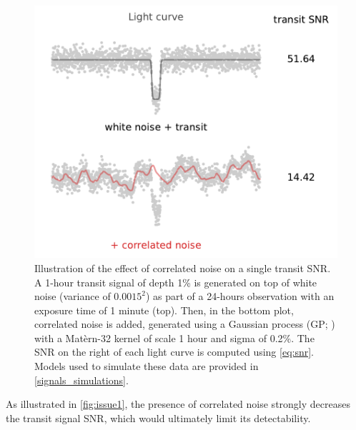 \documentclass[modern]{aastex631}
\begin{document}
\begin{figure}[H]
    \begin{centering}
        \includegraphics[width=0.6\linewidth]{../workflows/plot_issues/figures/issue1.pdf}
        \caption{Illustration of the effect of correlated noise on a single transit SNR. A 1-hour transit signal of depth 1\% is generated on top of white noise (variance of $0.0015^2$) as part of a 24-hours observation with an exposure time of 1 minute (top). Then, in the bottom plot, correlated noise is added, generated using a Gaussian process (GP; \citealt{Rasmussen2005}) with a Matèrn-32 kernel of scale 1 hour and sigma of 0.2\%. The SNR on the right of each light curve is computed using \autoref{eq:snr}. Models used to simulate these data are provided in \autoref{signals_simulations}.}
        \label{fig:issue1}
    \end{centering}
\end{figure}

As illustrated in \autoref{fig:issue1}, the presence of correlated noise strongly decreases the transit signal SNR, which would ultimately limit its detectability.
\end{document}
